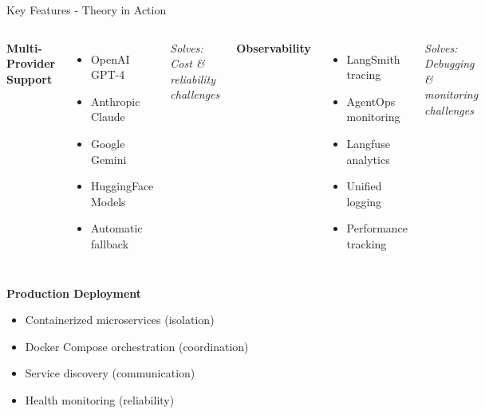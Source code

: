 \documentclass[aspectratio=169,11pt]{beamer}
\begin{document}
\begin{frame}{Key Features - Theory in Action}
\begin{columns}
\textbf{ Multi-Provider Support}
\begin{itemize}
    \item OpenAI GPT-4
    \item Anthropic Claude
    \item Google Gemini
    \item HuggingFace Models
    \item Automatic fallback
\end{itemize}

\textit{Solves: Cost \& reliability challenges}

\textbf{ Observability}
\begin{itemize}
    \item LangSmith tracing
    \item AgentOps monitoring
    \item Langfuse analytics
    \item Unified logging
    \item Performance tracking
\end{itemize}

\textit{Solves: Debugging \& monitoring challenges}
\end{columns}

\vspace{0.5cm}

\textbf{ Production Deployment}
\begin{itemize}
    \item Containerized microservices (isolation)
    \item Docker Compose orchestration (coordination)
    \item Service discovery (communication)
    \item Health monitoring (reliability)
\end{itemize}
\end{frame}
\end{document}

